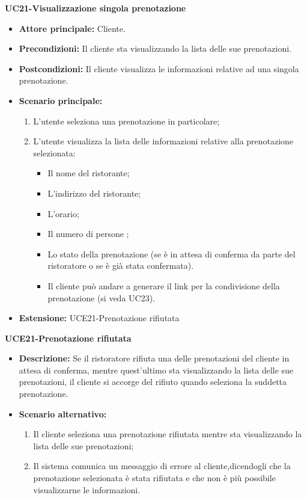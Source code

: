 \textbf{UC21-Visualizzazione singola prenotazione}
\begin{itemize}
    \item \textbf{Attore principale: } Cliente.
    \item \textbf{Precondizioni: }Il cliente sta visualizzando la lista delle sue prenotazioni.
    \item \textbf{Postcondizioni: }Il cliente visualizza le informazioni relative ad una singola prenotazione.
    \item \textbf{Scenario principale:} 
        \begin{enumerate}
            \item L'utente seleziona una prenotazione in particolare;
            \item L'utente visualizza la lista delle informazioni relative alla prenotazione selezionata:
            \begin{itemize}
                \item Il nome del ristorante;
                \item L'indirizzo del ristorante;
                \item L'orario;
                \item Il numero di persone ;
                \item Lo stato della prenotazione (se è in attesa di conferma da parte del ristoratore
                o se è già stata confermata).
            \item Il cliente può andare a generare il link per la condivisione della prenotazione (si veda UC23).
            \end{itemize}
        \end{enumerate}
    \item \textbf{Estensione: }UCE21-Prenotazione rifiutata
\end{itemize}

\textbf{UCE21-Prenotazione rifiutata}
\begin{itemize}
    \item \textbf{Descrizione: }Se il ristoratore rifiuta una delle prenotazioni del cliente in attesa di conferma,
    mentre quest'ultimo sta visualizzando la lista delle sue prenotazioni, il cliente si accorge del rifiuto quando
    seleziona la suddetta prenotazione.
    \item \textbf{Scenario alternativo: }
    \begin{enumerate}
        \item Il cliente seleziona una prenotazione rifiutata mentre sta visualizzando la lista 
        delle sue prenotazioni;
        \item Il sistema comunica un messaggio di errore al cliente,dicendogli che la prenotazione selezionata 
        è stata rifiutata e che non è più possibile visualizzarne le informazioni.
    \end{enumerate}
\end{itemize}

